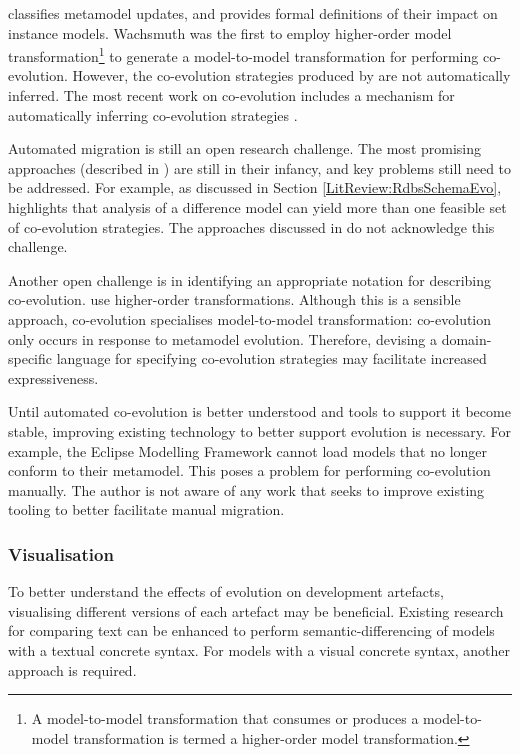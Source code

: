 \cite{wachsmuth07metamodel} classifies metamodel updates, and provides formal definitions of their impact on instance models. Wachsmuth was the first to employ higher-order model transformation\footnote{A model-to-model transformation that consumes or produces a model-to-model transformation is termed a higher-order model transformation.} to generate a model-to-model transformation for performing co-evolution. However, the co-evolution strategies produced by \cite{wachsmuth07metamodel} are not automatically inferred. The most recent work on co-evolution includes a mechanism for automatically inferring co-evolution strategies \cite{cicchetti08automating}.

Automated migration is still an open research challenge. The most promising approaches (described in \cite{wachsmuth07metamodel,cicchetti08automating}) are still in their infancy, and key problems still need to be addressed. For example, as discussed in Section \ref{LitReview:RdbsSchemaEvo}, \cite{lerner00model} highlights that analysis of a difference model can yield more than one feasible set of co-evolution strategies. The approaches discussed in \cite{wachsmuth07metamodel,cicchetti08automating} do not acknowledge this challenge.

Another open challenge is in identifying an appropriate notation for describing co-evolution.  \cite{wachsmuth07metamodel,cicchetti08automating} use higher-order transformations. Although this is a sensible approach, co-evolution specialises model-to-model transformation: co-evolution only occurs in response to metamodel evolution. Therefore, devising a domain-specific language for specifying co-evolution strategies may facilitate increased expressiveness.

Until automated co-evolution is better understood and tools to support it become stable, improving existing technology to better support evolution is necessary. For example, the Eclipse Modelling Framework \cite{emf} cannot load models that no longer conform to their metamodel. This poses a problem for performing co-evolution manually. The author is not aware of any work that seeks to improve existing tooling to better facilitate manual migration.


\subsubsection{Visualisation}
To better understand the effects of evolution on development artefacts, visualising different versions of each artefact may be beneficial. Existing research for comparing text can be enhanced to perform semantic-differencing of models with a textual concrete syntax. For models with a visual concrete syntax, another approach is required. 

